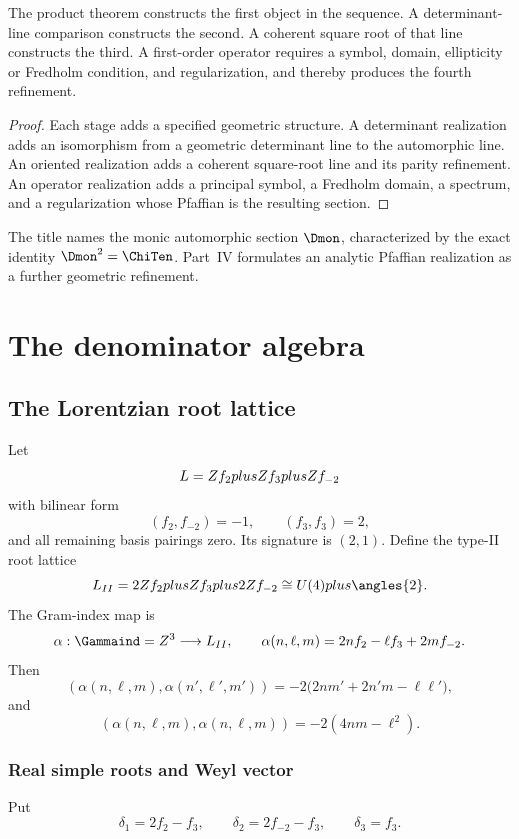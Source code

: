 \begin{proposition}
The product theorem constructs the first object in the sequence. A determinant-line comparison constructs the second. A coherent square root of that line constructs the third. A first-order operator requires a symbol, domain, ellipticity or Fredholm condition, and regularization, and thereby produces the fourth refinement.
\end{proposition}
\begin{proof}
Each stage adds a specified geometric structure. A determinant realization adds an isomorphism from a geometric determinant line to the automorphic line. An oriented realization adds a coherent square-root line and its parity refinement. An operator realization adds a principal symbol, a Fredholm domain, a spectrum, and a regularization whose Pfaffian is the resulting section.
\end{proof}

The title names the monic automorphic section $\Dmon$, characterized by the exact identity $\Dmon^2=\ChiTen$. Part~IV formulates an analytic Pfaffian realization as a further geometric refinement.

\part{The denominator algebra}

\chapter{The Lorentzian root lattice}
Let
\[
 L=Z f_2plusZ f_3plusZ f_{-2}
\]
with bilinear form
\[
 (f_2,f_{-2})=-1,
 \qquad (f_3,f_3)=2,
\]
and all remaining basis pairings zero. Its signature is $(2,1)$. Define the type-II root lattice
\[
 L_{II}=2\Z f_2\oplus\Z f_3\oplus2\Z f_{-2}
 \cong U(4)\oplus\angles{2}.
\]
The Gram-index map is
\[
 \alpha:\Gammaind=\Z^3\longrightarrow L_{II},
 \qquad
 \alpha(n,\ell,m)=2nf_2-\ell f_3+2mf_{-2}.
\]
Then
\[
 (\alpha(n,\ell,m),\alpha(n',\ell',m'))
 =-2\bigl(2nm'+2n'm-\ell\ell'\bigr),
\]
and
\[
 (\alpha(n,\ell,m),\alpha(n,\ell,m))
 =-2(4nm-\ell^2).
\]

\section{Real simple roots and Weyl vector}
Put
\[
 \delta_1=2f_2-f_3,
 \qquad
 \delta_2=2f_{-2}-f_3,
 \qquad
 \delta_3=f_3.
\]

